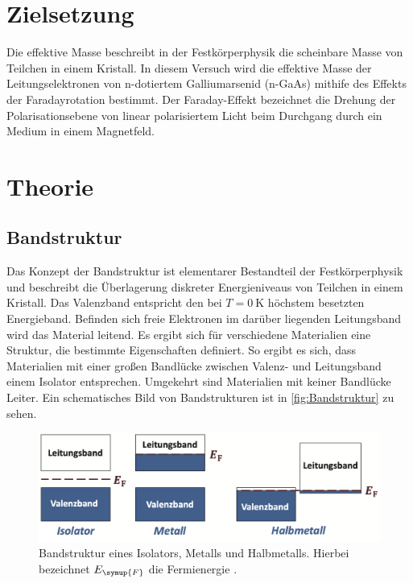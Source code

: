 \section{Zielsetzung}
\label{sec:Zielsetzung}
Die effektive Masse beschreibt in der Festkörperphysik die scheinbare Masse von Teilchen in einem Kristall. In diesem Versuch wird die effektive Masse der Leitungselektronen von
n-dotiertem Galliumarsenid (n-GaAs) mithife des Effekts der Faradayrotation bestimmt. Der Faraday-Effekt bezeichnet die Drehung der Polarisationsebene von linear polarisiertem Licht
beim Durchgang durch ein Medium in einem Magnetfeld.

\section{Theorie}
\label{sec:Theorie}
\subsection{Bandstruktur}
\label{subsec:Bandstruktur}
Das Konzept der Bandstruktur ist elementarer Bestandteil der Festkörperphysik und beschreibt die Überlagerung diskreter Energieniveaus von Teilchen in einem Kristall. Das Valenzband
entspricht den bei $T=\qty{0}{\kelvin}$ höchstem besetzten Energieband. Befinden sich freie Elektronen im darüber liegenden Leitungsband wird das Material leitend.
Es ergibt sich für verschiedene Materialien eine Struktur, die bestimmte Eigenschaften definiert. So ergibt es sich, dass Materialien mit einer großen Bandlücke zwischen 
Valenz- und Leitungsband einem Isolator entsprechen. Umgekehrt sind Materialien mit keiner Bandlücke Leiter. Ein schematisches Bild von Bandstrukturen ist in \autoref{fig:Bandstruktur}
zu sehen.

\begin{figure}
    \centering
    \includegraphics[width=\textwidth]{content/pics/Bandstruktur.png}
    \caption{Bandstruktur eines Isolators, Metalls und Halbmetalls. Hierbei bezeichnet $E_{\symup{F}}$ die Fermienergie \cite{GrossMarx2018}.}
    \label{fig:Bandstruktur}
\end{figure}

